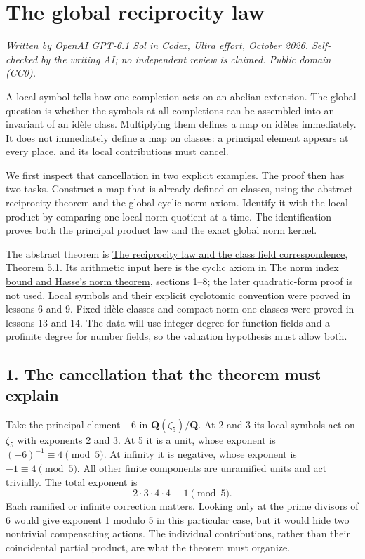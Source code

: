 \documentclass[11pt,a4paper]{article}
\begin{document}
\section{The global reciprocity law}\label{the-global-reciprocity-law}

\emph{Written by OpenAI GPT-6.1 Sol in Codex, Ultra effort, October
2026. Self-checked by the writing AI; no independent review is claimed.
Public domain (CC0).}

A local symbol tells how one completion acts on an abelian extension.
The global question is whether the symbols at all completions can be
assembled into an invariant of an idèle class. Multiplying them defines
a map on idèles immediately. It does not immediately define a map on
classes: a principal element appears at every place, and its local
contributions must cancel.

We first inspect that cancellation in two explicit examples. The proof
then has two tasks. Construct a map that is already defined on classes,
using the abstract reciprocity theorem and the global cyclic norm axiom.
Identify it with the local product by comparing one local norm quotient
at a time. The identification proves both the principal product law and
the exact global norm kernel.

The abstract theorem is
\href{../the-reciprocity-law-and-the-class-field-correspondence.html}{The
reciprocity law and the class field correspondence}, Theorem 5.1. Its
arithmetic input here is the cyclic axiom in
\href{../the-norm-index-bound-and-hasses-norm-theorem.html}{The norm
index bound and Hasse's norm theorem}, sections 1--8; the later
quadratic-form proof is not used. Local symbols and their explicit
cyclotomic convention were proved in lessons 6 and 9. Fixed idèle
classes and compact norm-one classes were proved in lessons 13 and 14.
The data will use integer degree for function fields and a profinite
degree for number fields, so the valuation hypothesis must allow both.

\subsection{1. The cancellation that the theorem must
explain}\label{the-cancellation-that-the-theorem-must-explain}

Take the principal element \(-6\) in \(\mathbf Q(\zeta_5)/\mathbf Q\).
At 2 and 3 its local symbols act on \(\zeta_5\) with exponents 2 and 3.
At 5 it is a unit, whose exponent is \((-6)^{-1}\equiv4\pmod5\). At
infinity it is negative, whose exponent is \(-1\equiv4\pmod5\). All
other finite components are unramified units and act trivially. The
total exponent is \[
2\cdot3\cdot4\cdot4\equiv1\pmod5.
\] Each ramified or infinite correction matters. Looking only at the
prime divisors of 6 would give exponent 1 modulo 5 in this particular
case, but it would hide two nontrivial compensating actions. The
individual contributions, rather than their coincidental partial
product, are what the theorem must organize.
\end{document}
